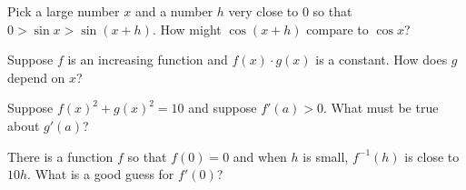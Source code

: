 \documentclass{ximera}
\newcommand{\recommendation}[1]{}
\begin{document}
\begin{shuffle}
\begin{problem}
  Pick a large number $x$ and a number $h$ very close to $0$ so that $0 > \sin x > \sin (x+h)$.  How might $\cos (x+h)$ compare to $\cos x$?
  \begin{multipleChoice}
  \end{multipleChoice}
\end{problem}



\begin{problem}
  Suppose $f$ is an increasing function and $f(x) \cdot g(x)$ is a constant.  How does $g$ depend on $x$?
  \begin{multipleChoice}
  \end{multipleChoice}
\end{problem}

\begin{problem}
  Suppose $f(x)^2 + g(x)^2 = 10$ and suppose $f'(a) > 0$.  What must be true about $g'(a)$?
  \begin{multipleChoice}
  \end{multipleChoice}
\end{problem}



\begin{problem}
  There is a function $f$ so that $f(0) = 0$ and when $h$ is small, $f^{-1}(h)$ is close to $10 h$.  What is a good guess for $f'(0)$?
  \begin{multipleChoice}
  \end{multipleChoice}
\end{problem}


\end{shuffle}
\end{document}
